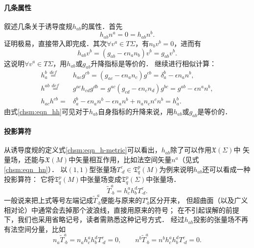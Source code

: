 \paragraph{几条属性}
叙述几条关于诱导度规$h_{ab}$的属性．首先
\begin{equation}\label{chsm:eqn_hn}
    h_{ab}{n}^a=0=h_{ab}{n}^b.
\end{equation}
证明极易，直接带入即完成．其次$\forall v^a \in T\Sigma$，有${n}_b v^b=0$，进而有
\begin{equation}
    h_{ab}v^b = (g_{ab}-\epsilon {n}_a {n}_b)v^b=g_{ab}v^b.
\end{equation}
这说明$\forall v^a \in T\Sigma$，用$h_{ab}$或$g_{ab}$升降指标是等价的．
继续进行相似计算：%
\begin{align}
    h_a^b\overset{def}{=}&h_{ac}g^{cb} =(g_{ac}-\epsilon {n}_a {n}_c)g^{cb}
      =\delta_a^b -\epsilon {n}_a {n}^b,  \label{chsm:eqn_hdaub} \\
    h^{ab}\overset{def}{=}&g^{ac}h_{cd}g^{db} =g^{ac}(g_{cd}-\epsilon {n}_c {n}_d)g^{bc}
      = g^{ab}-\epsilon{n}^a {n}^b, \label{chsm:eqn_huaub} \\
    h_{ac}h^{cb}=&\delta_a^b-\epsilon {n}_a {n}^b-\epsilon{n}_a {n}^b
        + {n}_a {n}_c{n}^c {n}^b    =h_a^b . \label{chsm:eqn_hh}
\end{align} %
由式\eqref{chsm:eqn_hh}可见对于$h_{ab}$自身指标的升降来说，用$h_{ab}$或$g_{ab}$是等价的．

\paragraph{投影算符}
从诱导度规的定义式\eqref{chsm:eqn_h-metric}可以看出，$h_{ab}$除了可以作用$\mathfrak{X}(\Sigma)$中
矢量场，还能与$\mathfrak{X}(M)$中矢量相互作用，比如法空间矢量${n}^a$（见式\eqref{chsm:eqn_hn}）．
以$(1,1)$型张量场$T^c_{\cdot d}\in \mathfrak{T}^p_q(M)$为例来说明$h_{ab}$还可以看成一种{\heiti 投影算符}：
它将$\mathfrak{T}^p_q(M)$中张量场变成$\mathfrak{T}^p_q(\Sigma)$中张量场．
\begin{equation}
    \widetilde{T}^a_{\cdot b} = h^a_c  h^d_ b T^c_{\cdot d} .
\end{equation}
一般说来把上式等号左端记成$\widetilde{T}^a_{\cdot b}$便能与原来的${T}^a_{\cdot b}$区分开来，
但超曲面（以及广义相对论）中通常会去掉那个波浪线，直接用原来的符号；
在不引起误解的前提下，我们也采用省略记号，读者需熟悉这种记号方式．
经过$h_{ab}$投影的张量场不再有法空间分量，比如
\begin{equation}
    {n}_a \widetilde{T}^a_{\cdot b}= {n}_a h^a_c  h^d_ b T^c_{\cdot d}=0, \qquad
    {n}^b \widetilde{T}^a_{\cdot b}= {n}^b h^a_c  h^d_ b T^c_{\cdot d}=0.
\end{equation}

